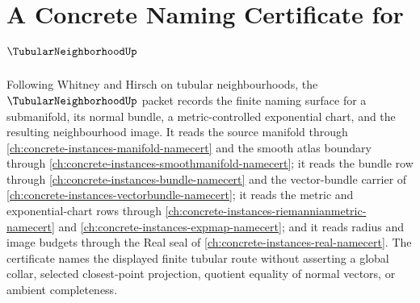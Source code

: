 \chapter{A Concrete Naming Certificate for $\TubularNeighborhoodUp$}
\label{ch:concrete-instances-tubular-neighborhood-namecert}

Following Whitney and Hirsch on tubular neighbourhoods, the $\TubularNeighborhoodUp$ packet records the finite naming surface for a submanifold, its normal bundle, a metric-controlled exponential chart, and the resulting neighbourhood image. It reads the source manifold through \autoref{ch:concrete-instances-manifold-namecert} and the smooth atlas boundary through \autoref{ch:concrete-instances-smoothmanifold-namecert}; it reads the bundle row through \autoref{ch:concrete-instances-bundle-namecert} and the vector-bundle carrier of \autoref{ch:concrete-instances-vectorbundle-namecert}; it reads the metric and exponential-chart rows through \autoref{ch:concrete-instances-riemannianmetric-namecert} and \autoref{ch:concrete-instances-expmap-namecert}; and it reads radius and image budgets through the Real seal of \autoref{ch:concrete-instances-real-namecert}. The certificate names the displayed finite tubular route without asserting a global collar, selected closest-point projection, quotient equality of normal vectors, or ambient completeness.

